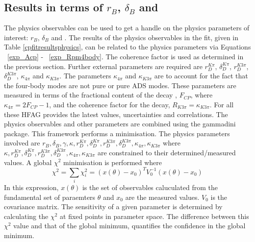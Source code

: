 \subsection{Results in terms of $r_B$, $\delta_B$ and \Pgamma}
\label{sec:interpretation:gammadini}

The physics observables can be used to get a handle on the physics parameters of interest: $r_B$, $\delta_B$ and \Pgamma. 
The results of the physics observables in the \CP fit, given in Table \ref{cpfitresultsphysics}, can be related to the physics parameters via Equations ~\ref{exp_Acp} - ~\ref{exp_Rpm4body}. The coherence factor is used as determined in the previous section. Further external parameters are required are $r_D^{K\pi}$, $\delta_D^{K\pi}$, $r_D^{K3\pi}$, $\delta_D^{K3\pi}$, $\kappa_{4\pi}$ and $\kappa_{K3\pi}$. The parameters $\kappa_{4\pi}$ and $\kappa_{K3\pi}$ are to account for the fact that the four-body modes are not pure \CP or pure ADS modes. These parameters are measured in terms of the fractional \CP content of the decay \decay{\Dz}{\pip\pim\pip\pim}, $F_{CP}$, where $\kappa_{4\pi} = 2F_{CP} - 1$, and the coherence factor for the \decay{\Dz}{\Km\pip\pim\pip} decay, $R_{K3\pi} = \kappa_{K3\pi}$. For all these HFAG provides the latest values, uncertainties and correlations.
The physics observables and other parameters are combined using the gammadini package. This framework performs a minimisation. The physics parameters involved are $r_B, \delta_B, \gamma, \kappa, r_D^{K\pi}, \delta_D^{K\pi}, r_D^{K3\pi}, \delta_D^{K3\pi}, \kappa_{4\pi}, \kappa_{K3\pi}$ where $\kappa, r_D^{K\pi}, \delta_D^{K\pi}, r_D^{K3\pi}, \delta_D^{K3\pi}, \kappa_{4\pi}, \kappa_{K3\pi}$ are constrained to their determined/measured values. 
A global $\chi^2$ minimisation is performed where
\begin{equation}
\chi^2 = \sum_i \chi^2_i = (x(\theta) - x_0)^TV_0^{-1}(x(\theta)-x_0)
\end{equation}
In this expression, $x(\theta)$ is the set of observables caluculated from the fundamental set of paraemters $\theta$ and $x_0$ are the measured values. $V_0$ is the covariance matrix.
The sensitivity of a given parameter is determined by calculating the $\chi^2$ at fixed points in parameter space. The difference between this $\chi^2$ value and that of the global minimum, quantifies the confidence in the global minimum. 


